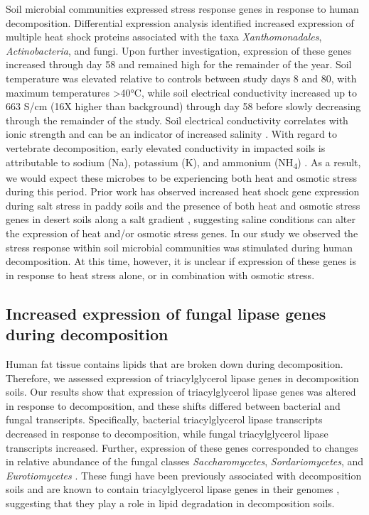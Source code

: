 \documentclass[
  sn-nature,
  lineno, referee]{sn-jnl}
\begin{document}
Soil microbial communities expressed stress response genes in response
to human decomposition. Differential expression analysis identified
increased expression of multiple heat shock proteins associated with the
taxa \emph{Xanthomonadales}, \emph{Actinobacteria}, and fungi. Upon
further investigation, expression of these genes increased through day
58 and remained high for the remainder of the year. Soil temperature was
elevated relative to controls between study days 8 and 80, with maximum
temperatures \textgreater40°C, while soil electrical conductivity
increased up to 663 \textmu S/cm (16X higher than background) through
day 58 before slowly decreasing through the remainder of the study. Soil
electrical conductivity correlates with ionic strength and can be an
indicator of increased salinity \citep{essington_soil_2015}. With regard
to vertebrate decomposition, early elevated conductivity in impacted
soils is attributable to sodium (Na), potassium (K), and ammonium
(NH\textsubscript{4})
\citep{keenan_mortality_2018, fancher_evaluation_2017, quaggiotto_dynamic_2019, taylor_soil_2023, taylor_transient_2024}.
As a result, we would expect these microbes to be experiencing both heat
and osmotic stress during this period. Prior work has observed increased
heat shock gene expression during salt stress in paddy soils
\citep{peng_short-term_2017} and the presence of both heat and osmotic
stress genes in desert soils along a salt gradient
\citep{pandit_snapshot_2015}, suggesting saline conditions can alter the
expression of heat and/or osmotic stress genes. In our study we observed
the stress response within soil microbial communities was stimulated
during human decomposition. At this time, however, it is unclear if
expression of these genes is in response to heat stress alone, or in
combination with osmotic stress.

\subsection{Increased expression of fungal lipase genes during
decomposition}\label{increased-expression-of-fungal-lipase-genes-during-decomposition}

Human fat tissue contains lipids that are broken down during
decomposition. Therefore, we assessed expression of triacylglycerol
lipase genes in decomposition soils. Our results show that expression of
triacylglycerol lipase genes was altered in response to decomposition,
and these shifts differed between bacterial and fungal transcripts.
Specifically, bacterial triacylglycerol lipase transcripts decreased in
response to decomposition, while fungal triacylglycerol lipase
transcripts increased. Further, expression of these genes corresponded
to changes in relative abundance of the fungal classes
\emph{Saccharomycetes}, \emph{Sordariomycetes}, and
\emph{Eurotiomycetes} \citep{taylor_transient_2024}. These fungi have
been previously associated with decomposition soils
\citep{metcalf_microbial_2016, fu_fungal_2019} and are known to contain
triacylglycerol lipase genes in their genomes
\citep{dujon_genome_2004, haridas_genome_2013}, suggesting that they
play a role in lipid degradation in decomposition soils.
\end{document}
